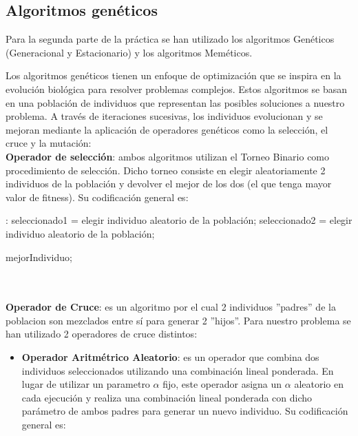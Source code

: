 \subsection{Algoritmos genéticos}
Para la segunda parte de la práctica se han utilizado los algoritmos Genéticos (Generacional y Estacionario) y los algoritmos Meméticos. 

Los algoritmos genéticos tienen un enfoque de optimización que se inspira en la evolución biológica para resolver problemas complejos. Estos algoritmos se basan en una población de individuos que representan las posibles soluciones a nuestro problema. A través de iteraciones sucesivas, los individuos evolucionan y se mejoran mediante la aplicación de operadores genéticos como la selección, el cruce y la mutación:\\

\textbf{Operador de selección}: ambos algoritmos utilizan el Torneo Binario como procedimiento de selección. Dicho torneo consiste en elegir aleatoriamente 2 individuos de la población y devolver el mejor de los dos (el que tenga mayor valor de fitness). Su codificación general es:
	
	\begin{algorithm}[H]
	
	
	\BlankLine
	:
	\BlankLine
	seleccionado1 = elegir individuo aleatorio de la población;
	seleccionado2 = elegir individuo aleatorio de la población;
	
	\BlankLine
	\BlankLine
	\Return mejorIndividuo;
\end{algorithm}
\quad\\\quad\\
	\textbf{Operador de Cruce}: es un algoritmo por el cual 2 individuos ''padres'' de la poblacion son mezclados entre sí para generar 2 ''hijos''. Para nuestro problema se han utilizado 2 operadores de cruce distintos:
	
	\begin{itemize}
	\item \textbf{Operador Aritmétrico Aleatorio}: es un operador que combina dos individuos seleccionados utilizando una combinación lineal ponderada. En lugar de utilizar un parametro $\alpha$ fijo, este operador asigna un $\alpha$ aleatorio en cada ejecución y realiza una combinación lineal ponderada con dicho parámetro de ambos padres para generar un nuevo individuo. Su codificación general es:
	\end{itemize}


